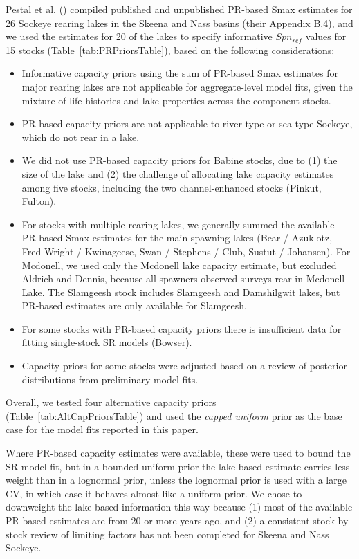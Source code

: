 \documentclass[french,11pt]{book}
\begin{document}
Pestal et al. () compiled published and unpublished PR-based Smax estimates for 26 Sockeye rearing lakes in the Skeena and Nass basins (their Appendix B.4), and we used the estimates for 20 of the lakes to specify informative \(Spn_{ref}\) values for 15 stocks (Table~\ref{tab:PRPriorsTable}), based on the following considerations:
\begin{itemize}

\item
  Informative capacity priors using the sum of PR-based Smax estimates for major rearing lakes are not applicable for aggregate-level model fits, given the mixture of life histories and lake properties across the component stocks.
\item
  PR-based capacity priors are not applicable to river type or sea type Sockeye, which do not rear in a lake.
\item
  We did not use PR-based capacity priors for Babine stocks, due to (1) the size of the lake and (2) the challenge of allocating lake capacity estimates among five stocks, including the two channel-enhanced stocks (Pinkut, Fulton).
\item
  For stocks with multiple rearing lakes, we generally summed the available PR-based Smax estimates for the main spawning lakes (Bear / Azuklotz, Fred Wright / Kwinageese, Swan / Stephens / Club, Sustut / Johansen). For Mcdonell, we used only the Mcdonell lake capacity estimate, but excluded Aldrich and Dennis, because all spawners observed surveys rear in Mcdonell Lake. The Slamgeesh stock includes Slamgeesh and Damshilgwit lakes, but PR-based estimates are only available for Slamgeesh.
\item
  For some stocks with PR-based capacity priors there is insufficient data for fitting single-stock SR models (Bowser).
\item
  Capacity priors for some stocks were adjusted based on a review of posterior distributions from preliminary model fits.
\end{itemize}
Overall, we tested four alternative capacity priors (Table~\ref{tab:AltCapPriorsTable}) and used the \emph{capped uniform} prior as the base case for the model fits reported in this paper.

Where PR-based capacity estimates were available, these were used to bound the SR model fit, but in a bounded uniform prior the lake-based estimate carries less weight than in a lognormal prior, unless the lognormal prior is used with a large CV, in which case it behaves almost like a uniform prior. We chose to downweight the lake-based information this way because (1) most of the available PR-based estimates are from 20 or more years ago, and (2) a consistent stock-by-stock review of limiting factors has not been completed for Skeena and Nass Sockeye.
\end{document}
